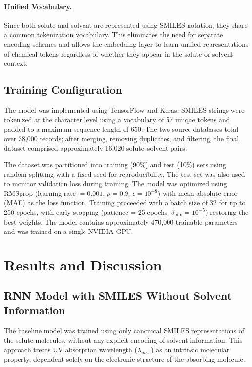 \documentclass[11pt,a4paper]{article}
\begin{document}
\paragraph{Unified Vocabulary.} Since both solute and solvent are represented using SMILES notation, they share a common tokenization vocabulary. This eliminates the need for separate encoding schemes and allows the embedding layer to learn unified representations of chemical tokens regardless of whether they appear in the solute or solvent context.



\subsection{Training Configuration}

The model was implemented using TensorFlow and Keras. SMILES strings were tokenized at the character level using a vocabulary of 57 unique tokens and padded to a maximum sequence length of 650. The two source databases total over 38,000 records; after merging, removing duplicates, and filtering, the final dataset comprised approximately 16,020 solute--solvent pairs.

The dataset was partitioned into training (90\%) and test (10\%) sets using random splitting with a fixed seed for reproducibility. The test set was also used to monitor validation loss during training. The model was optimized using RMSprop (learning rate $= 0.001$, $\rho = 0.9$, $\epsilon = 10^{-8}$) with mean absolute error (MAE) as the loss function. Training proceeded with a batch size of 32 for up to 250 epochs, with early stopping (patience = 25 epochs, $\delta_{\min} = 10^{-5}$) restoring the best weights. The model contains approximately 470,000 trainable parameters and was trained on a single NVIDIA GPU.

\section{Results and Discussion}

\subsection{RNN Model with SMILES Without Solvent Information}

The baseline model was trained using only canonical SMILES representations of the solute molecules, without any explicit encoding of solvent information. This approach treats UV absorption wavelength ($\lambda_{max}$) as an intrinsic molecular property, dependent solely on the electronic structure of the absorbing molecule.
\end{document}
